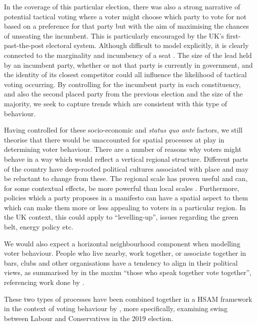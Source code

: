\documentclass[webpdf,large,contemporary,namedate]{oup-authoring-template}
\theoremstyle{thmstyleone}
\theoremstyle{thmstyletwo}
\theoremstyle{thmstylethree}
\begin{document}
In the coverage of this particular election, there was also a strong
narrative of potential tactical voting where a voter might choose which
party to vote for not based on a preference for that party but with the
aim of maximising the chances of unseating the incumbent. This is
particularly encouraged by the UK's first-past-the-post electoral
system. Although difficult to model explicitly, it is clearly connected
to the marginality and incumbency of a seat \citep{Muller2015}. The size
of the lead held by an incumbent party, whether or not that party is
currently in government, and the identity of its closest competitor
could all influence the likelihood of tactical voting occurring. By
controlling for the incumbent party in each constituency, and also the
second placed party from the previous election and the size of the
majority, we seek to capture trends which are consistent with this type
of behaviour.

Having controlled for these socio-economic and \emph{status quo ante}
factors, we still theorise that there would be unaccounted for spatial
processes at play in determining voter behaviour. There are a number of
reasons why voters might behave in a way which would reflect a vertical
regional structure. Different parts of the country have deep-rooted
political cultures associated with place and may be reluctant to change
from these. The regional scale has proven useful
\citep{pattie1995region} and can, for some contextual effects, be more
powerful than local scales \citep{Pattie2013}. Furthermore, policies
which a party proposes in a manifesto can have a spatial aspect to them
which can make them more or less appealing to voters in a particular
region. In the UK context, this could apply to ``levelling-up'', issues
regarding the green belt, energy policy etc.

We would also expect a horizontal neighbourhood component when modelling
voter behaviour. People who live nearby, work together, or associate
together in bars, clubs and other organisations have a tendency to align
in their political views, as summarised by \citet{pattie2000} in the
maxim ``those who speak together vote together'', referencing work done
by \citet{Miller1977}.

These two types of processes have been combined together in a HSAM
framework in the context of voting behaviour by \citet{Horan2024}, more
specifically, examining swing between Labour and Conservatives in the
2019 election.
\end{document}
